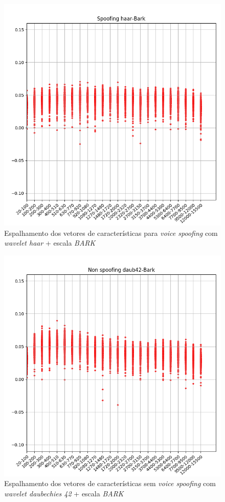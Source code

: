 		\begin{figure}
			\centering
			\includegraphics[width=\linewidth]{images/results/barkVersusMel/spoofingHaarBark}
			\caption{Espalhamento dos vetores de características para \textit{voice spoofing} com \textit{wavelet haar} + escala \textit{BARK} }
			\label{fig:spoofinghaarbark}
		\end{figure}
		\begin{figure}
			\centering
			\includegraphics[width=\linewidth]{images/results/barkVersusMel/liveDaub42Bark}
			\caption{Espalhamento dos vetores de características sem \textit{voice spoofing} com \textit{wavelet daubechies 42} + escala \textit{BARK} }
			\label{fig:livedaub42bark}
		\end{figure}
